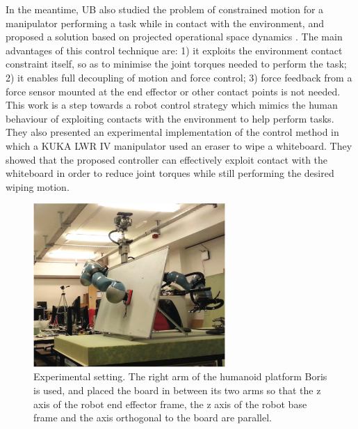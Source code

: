 In the meantime, UB also studied the problem of constrained motion for a manipulator performing
a task while in contact with the environment, and proposed a solution based on
projected operational space dynamics \cite{Ortenzietal14}.  The main
advantages of this control technique are: 1) it exploits the environment
contact constraint itself, so as to minimise the joint torques needed to
perform the task; 2) it enables full decoupling of motion and force control;
3) force feedback from a force sensor mounted at the end effector or other
contact points is not needed.  This work is a step towards a robot control
strategy which mimics the human behaviour of exploiting contacts with the
environment to help perform tasks.  They also presented an experimental
implementation of the control method in which a KUKA LWR IV manipulator used
an eraser to wipe a whiteboard.  They showed that the proposed controller can
effectively exploit contact with the whiteboard in order to reduce joint
torques while still performing the desired wiping motion.

\begin{figure}[h!]
  \centering
  \includegraphics[width=0.65\textwidth]{images/whiteboard.pdf}
  \caption{Experimental setting. The right arm of the humanoid
    platform Boris is used, and placed the board in between its two arms so that the z
    axis of the robot end effector frame, the z axis of the robot base frame
    and the axis orthogonal to the board are parallel.}
  \label{whiteboard}
\end{figure}









